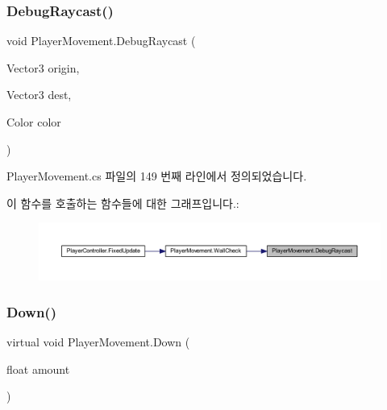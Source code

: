 \subsubsection{\texorpdfstring{DebugRaycast()}{DebugRaycast()}}
{\footnotesize\ttfamily void Player\+Movement.\+Debug\+Raycast (\begin{DoxyParamCaption}\item[{Vector3}]{origin,  }\item[{Vector3}]{dest,  }\item[{Color}]{color }\end{DoxyParamCaption})\hspace{0.3cm}{\ttfamily [private]}}



Player\+Movement.\+cs 파일의 149 번째 라인에서 정의되었습니다.


\begin{DoxyCode}{0}

\end{DoxyCode}
이 함수를 호출하는 함수들에 대한 그래프입니다.\+:\nopagebreak
\begin{figure}[H]
\begin{center}
\leavevmode
\includegraphics[width=350pt]{d0/d3d/class_player_movement_a10abf2ced0397cbfa0cc29a0296023fb_icgraph}
\end{center}
\end{figure}
\mbox{\label{class_player_movement_ae4905085466c9d84cc032807f704fb41}} 
\subsubsection{\texorpdfstring{Down()}{Down()}}
{\footnotesize\ttfamily virtual void Player\+Movement.\+Down (\begin{DoxyParamCaption}\item[{float}]{amount }\end{DoxyParamCaption})\hspace{0.3cm}{\ttfamily [virtual]}}



